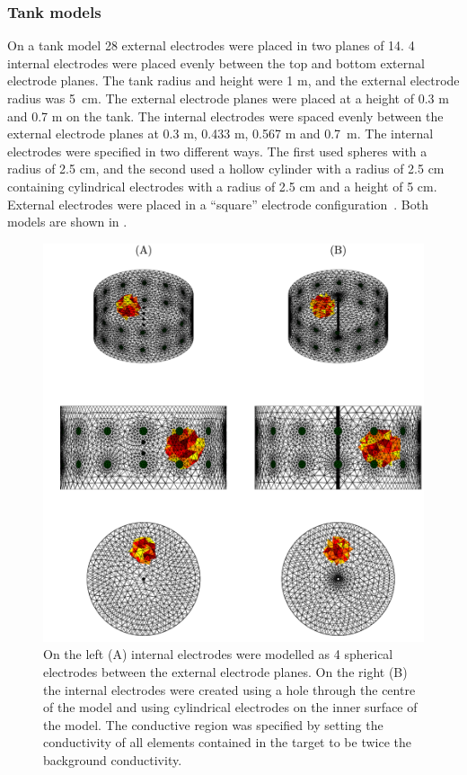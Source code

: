 \subsubsection{Tank models}
On a tank model 28 external electrodes were placed in two planes of 14. 
4 internal electrodes were placed evenly between the top and bottom external electrode planes. 
The tank radius and height were 1 m, and the external electrode radius was 5 cm. 
The external electrode planes were placed at a height of 0.3 m and 0.7 m on the tank. 
The internal electrodes were spaced evenly between the external electrode planes 
at 0.3 m, 0.433 m, 0.567 m and 0.7 m. The internal electrodes were specified in 
two different ways. The first used spheres with a radius of 2.5 cm, and the second 
used a hollow cylinder with a radius of 2.5 cm containing cylindrical electrodes
with a radius of 2.5 cm and a height of 5 cm. External electrodes were
placed in a ``square'' electrode configuration~\parencite{grychtol_3d_2016}. 
Both models are shown in .

\begin{figure}[H]
    \centering
   \includegraphics[width=\textwidth]{chapter7-internal_elec_motion/imgs/probe_types.pdf} 
   \caption[Spherical and cylindrical internal electrodes]{\label{fig:probe_types} 
   On the left (A) internal electrodes were modelled as 4 spherical electrodes between the 
   external electrode planes. On the right (B) the internal electrodes were created using 
   a hole through the centre of the model and using cylindrical electrodes on the inner 
   surface of the model.
	The conductive region was specified by setting the conductivity of all elements 
	contained in the target to be twice the background conductivity.}
\end{figure}

